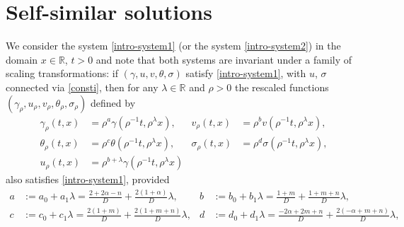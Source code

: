 \documentclass[11pt]{article}
\def\R{\mathbb{R}}
\theoremstyle{remark}
\begin{document}
\section{Self-similar solutions} \label{sec:scale}

We consider the  system \eqref{intro-system1}  (or the system \eqref{intro-system2}) in the domain $x \in \R$, $t > 0$
and note that both systems are invariant under a  family of scaling transformations:
if $(\gamma,u,v,\theta,\sigma)$ satisfy \eqref{intro-system1}, with $u$, $\sigma$ connected via \eqref{consti}, then for any $\lambda \in \mathbb{R}$ and $\rho > 0$ the rescaled functions
$(\gamma_\rho, u_\rho,v_\rho,\theta_\rho,\sigma_\rho)$ defined by
\begin{equation}\label{eq:scale}
\begin{aligned}
 \gamma_\rho(t,x) &= \rho^a\gamma(\rho^{-1}t,\rho^\lambda x), &
 v_\rho(t,x) &= \rho^bv(\rho^{-1}t,\rho^\lambda x),\\
 \theta_\rho(t,x) &= \rho^c\theta(\rho^{-1}t,\rho^\lambda x), &
 \sigma_\rho(t,x) &= \rho^d\sigma(\rho^{-1}t,\rho^\lambda x),\\
 u_\rho(t,x) &= \rho^{b+\lambda}\gamma(\rho^{-1}t,\rho^\lambda x)
\end{aligned}
\end{equation}
also satisfies \eqref{intro-system1}, provided
\begin{equation} \label{eq:exponents}
\begin{aligned}
 a&:= a_0 + a_1 \lambda=\frac{2+2\alpha-n}{D} + \frac{2(1 + \alpha)}{D}\lambda, & b&:=b_0 + b_1\lambda=\frac{1+m}{D} + \frac{1+m+n}{D}\lambda ,\\
 c&:=c_0 + c_1\lambda=\frac{2(1+m)}{D} + \frac{2(1+m+n)}{D}\lambda, & d&:=d_0 + d_1\lambda=\frac{-2\alpha + 2m +n}{D} + \frac{2(-\alpha+m+n)}{D}\lambda,
\end{aligned}
\end{equation}
\end{document}
